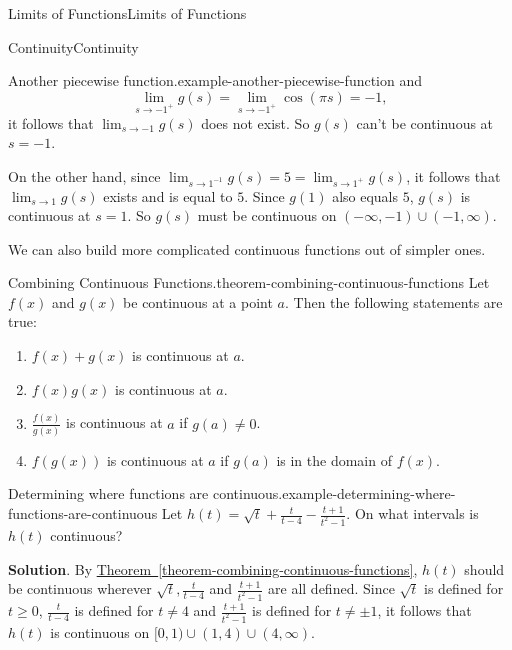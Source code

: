 \documentclass[10pt,]{book}
\numberwithin{equation}{section}
\begin{document}
\begin{chapterptx}{Limits of Functions}{}{Limits of Functions}{}{}
\begin{sectionptx}{Continuity}{}{Continuity}{}{}
\begin{example}{Another piecewise function.}{example-another-piecewise-function}
and%
\begin{equation*}
\lim_{s\to-1^{+}}g(s) = \lim_{s\to-1^{+}}\cos(\pi s) = -1,
\end{equation*}
it follows that \(\lim_{s\to-1}g(s)\) does not exist. So \(g(s)\) can't be continuous at \(s=-1\).%
\par
\hypertarget{p-45}{}%
On the other hand, since \(\lim_{s\to1^{-1}}g(s) = 5 = \lim_{s\to1^{+}}g(s)\), it follows that \(\lim_{s\to1}g(s)\) exists and is equal to \(5\). Since \(g(1)\) also equals \(5\), \(g(s)\) is continuous at \(s=1\). So \(g(s)\) must be continuous on \((-\infty, -1)\cup(-1,\infty)\).%
\end{example}
\hypertarget{p-46}{}%
We can also build more complicated continuous functions out of simpler ones.%
\begin{theorem}{Combining Continuous Functions.}{}{theorem-combining-continuous-functions}%
\hypertarget{p-47}{}%
Let \(f(x)\) and \(g(x)\) be continuous at a point \(a\). Then the following statements are true: \leavevmode%
\begin{enumerate}
\item\hypertarget{li-1}{}\(f(x)+g(x)\) is continuous at \(a\).%
\item\hypertarget{li-2}{}\(f(x)g(x)\) is continuous at \(a\).%
\item\hypertarget{li-3}{}\(\frac{f(x)}{g(x)}\) is continuous at \(a\) if \(g(a)\neq0\).%
\item\hypertarget{li-4}{}\(f(g(x))\) is continuous at \(a\) if \(g(a)\) is in the domain of \(f(x)\).%
\end{enumerate}
%
\end{theorem}
\begin{example}{Determining where functions are continuous.}{example-determining-where-functions-are-continuous}%
\hypertarget{p-48}{}%
Let \(h(t) = \sqrt{t} + \frac{t}{t-4} - \frac{t+1}{t^{2}-1}\). On what intervals is \(h(t)\) continuous?%
\par\smallskip%
\noindent\textbf{Solution}.\hypertarget{solution-9}{}\quad%
\hypertarget{p-49}{}%
By \hyperref[theorem-combining-continuous-functions]{Theorem~\ref{theorem-combining-continuous-functions}}, \(h(t)\) should be continuous wherever \(\sqrt{t}, \frac{t}{t-4}\) and \(\frac{t+1}{t^{2}-1}\) are all defined. Since \(\sqrt{t}\) is defined for \(t\geq0\), \(\frac{t}{t-4}\) is defined for \(t\neq4\) and \(\frac{t+1}{t^{2}-1}\) is defined for \(t\neq\pm1\), it follows that \(h(t)\) is continuous on \([0,1)\cup(1,4)\cup(4,\infty)\).%
\end{example}

\end{sectionptx}
\end{chapterptx}
\end{document}
